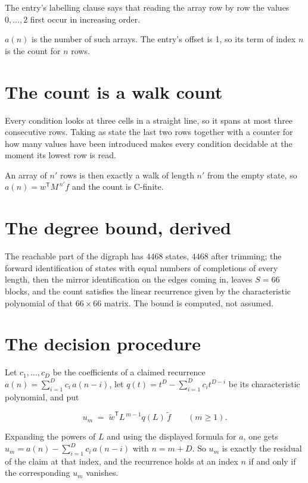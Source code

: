 \documentclass[11pt]{article}
\theoremstyle{definition}
\begin{document}
The entry's labelling clause says that reading the array row by row the values $0,\dots,2$ first occur in increasing order.

$a(n)$ is the number of such arrays. The entry's offset is 1, so its term of index $n$ is the count for $n$ rows.

\section{The count is a walk count}

Every condition looks at three cells in a straight line, so it spans at most three consecutive rows. Taking as state the last two rows together with a counter for how many values have been introduced makes every condition decidable at the moment its lowest row is read.

An array of $n'$ rows is then exactly a walk of length $n'$ from the empty state, so $a(n) = w^{\mathsf T}M^{\,n'}f$ and the count is C-finite.

\section{The degree bound, derived}

The reachable part of the digraph has $4468$ states, $4468$ after trimming; the forward identification of states with equal numbers of completions of every length, then the mirror identification on the edges coming in, leaves $S = 66$ blocks, and the count satisfies the linear recurrence given by the characteristic polynomial of that $66\times66$ matrix. The bound is computed, not assumed.

\section{The decision procedure}

Let $c_1,\dots,c_D$ be the coefficients of a claimed recurrence $a(n) = \sum_{i=1}^{D} c_i\,a(n-i)$, let $q(t) = t^{D} - \sum_{i=1}^{D} c_i t^{D-i}$ be its characteristic polynomial, and put

\[u_m \;=\; \tilde w^{\mathsf T} L^{\,m-1} q(L)\,\tilde f \qquad (m \ge 1).\]

Expanding the powers of $L$ and using the displayed formula for $a$, one gets $u_m = a(n) - \sum_{i=1}^{D} c_i\,a(n-i)$ with $n = m + D$. So $u_m$ is exactly the residual of the claim at that index, and the recurrence holds at an index $n$ if and only if the corresponding $u_m$ vanishes.
\end{document}
